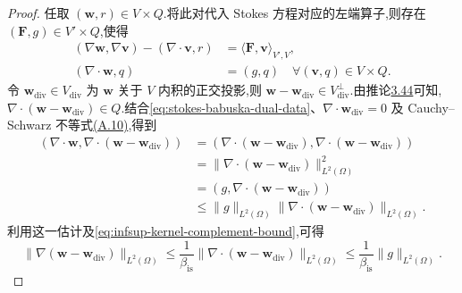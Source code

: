 \begin{proof}
任取 $(\bm{w},r)\in V\times Q$.将此对代入 Stokes 方程对应的左端算子,则存在 $(\bm{F},g)\in V'\times Q$,使得
\begin{equation}\label{eq:stokes-babuska-dual-data}
\begin{aligned}
  (\nabla\bm{w},\nabla\bm{v})
     -(\nabla\cdot\bm{v},r)
     &=\langle\bm{F},\bm{v}\rangle_{V',V},\\
  (\nabla\cdot\bm{w},q)&=(g,q)
      \quad\forall(\bm{v},q)\in V\times Q.
\end{aligned}
\end{equation}
令 $\bm{w}_{\mathrm{div}}\in V_{\mathrm{div}}$ 为 $\bm{w}$ 关于 $V$ 内积的正交投影,则 $\bm{w}-\bm{w}_{\mathrm{div}}\in V_{\mathrm{div}}^{\perp}$.由推论\hyperref[cor:each-pressure-is-divergence]{3.44}可知,$\nabla\cdot(\bm{w}-\bm{w}_{\mathrm{div}})\in Q$.结合\cref{eq:stokes-babuska-dual-data}、$\nabla\cdot\bm{w}_{\mathrm{div}}=0$ 及 Cauchy--Schwarz 不等式\hyperref[eq:appendix-a-10]{(A.10)},得到
\[
\begin{aligned}
  (\nabla\cdot\bm{w},\nabla\cdot(\bm{w}-\bm{w}_{\mathrm{div}}))
   &=(\nabla\cdot(\bm{w}-\bm{w}_{\mathrm{div}}),
       \nabla\cdot(\bm{w}-\bm{w}_{\mathrm{div}}))\\
   &=\|\nabla\cdot(\bm{w}-\bm{w}_{\mathrm{div}})\|_{L^2(\Omega)}^2\\
   &=(g,\nabla\cdot(\bm{w}-\bm{w}_{\mathrm{div}}))\\
   &\leq\|g\|_{L^2(\Omega)}
      \|\nabla\cdot(\bm{w}-\bm{w}_{\mathrm{div}})\|_{L^2(\Omega)}.
\end{aligned}
\]
利用这一估计及\cref{eq:infsup-kernel-complement-bound},可得
\[
  \|\nabla(\bm{w}-\bm{w}_{\mathrm{div}})\|_{L^2(\Omega)}
   \leq\frac{1}{\beta_{\mathrm{is}}}
       \|\nabla\cdot(\bm{w}-\bm{w}_{\mathrm{div}})\|_{L^2(\Omega)}
   \leq\frac{1}{\beta_{\mathrm{is}}}\|g\|_{L^2(\Omega)}.
\]


\end{proof}
